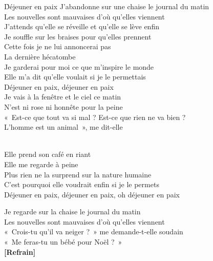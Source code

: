 \documentclass{novel}
\begin{document}
\newpage
\normalsize

\h*{Déjeuner en paix}
J'abandonne sur une chaise le journal du matin \\
Les nouvelles sont mauvaises d'où qu'elles viennent \\
J'attends qu'elle se réveille et qu'elle se lève enfin \\
Je souffle sur les braises pour qu'elles prennent \\

Cette fois je ne lui annoncerai pas \\
La dernière hécatombe \\
Je garderai pour moi ce que m'inspire le monde \\
Elle m'a dit qu'elle voulait si je le permettais \\
Déjeuner en paix, déjeuner en paix \\

Je vais à la fenêtre et le ciel ce matin \\
N'est ni rose ni honnête pour la peine \\
«~Est-ce que tout va si mal ? Est-ce que rien ne va bien ? \\
L'homme est un animal~», me dit-elle \\

\begin{bfseries}
[Refrain:]\\
Elle prend son café en riant \\
Elle me regarde à peine \\
Plus rien ne la surprend sur la nature humaine \\
C'est pourquoi elle voudrait enfin si je le permets \\
Déjeuner en paix, déjeuner en paix, oh déjeuner en paix \\
\end{bfseries}

Je regarde sur la chaise le journal du matin \\
Les nouvelles sont mauvaises d'où qu'elles viennent \\
«~Crois-tu qu'il va neiger ?~» me demande-t-elle soudain \\
«~Me feras-tu un bébé pour Noël ?~» \\

\textbf{[Refrain]}\\


\newpage
\small
\end{document}
